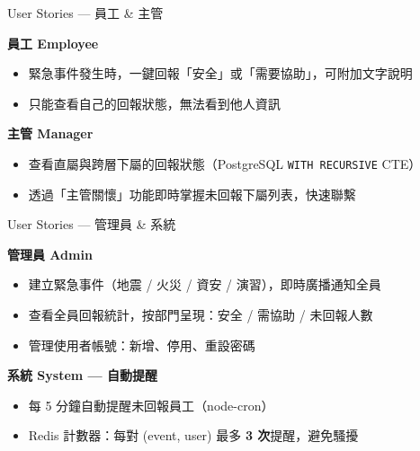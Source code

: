 \documentclass[aspectratio=169,12pt]{beamer}
\begin{document}
\begin{frame}{User Stories — 員工 \& 主管}
\begin{block}{\textbf{員工 \enspace Employee}}
  \begin{itemize}\small
    \item 緊急事件發生時，\alert{一鍵回報「安全」或「需要協助」}，可附加文字說明
    \item 只能查看\alert{自己的回報狀態}，無法看到他人資訊
  \end{itemize}
\end{block}
\vspace{0.35cm}
\begin{block}{\textbf{主管 \enspace Manager}}
  \begin{itemize}\small
    \item 查看\alert{直屬與跨層下屬}的回報狀態（PostgreSQL \texttt{WITH RECURSIVE} CTE）
    \item 透過「主管關懷」功能即時掌握\alert{未回報下屬}列表，快速聯繫
  \end{itemize}
\end{block}
\end{frame}

\begin{frame}{User Stories — 管理員 \& 系統}
\begin{block}{\textbf{管理員 \enspace Admin}}
  \begin{itemize}\small
    \item \alert{建立緊急事件}（地震 / 火災 / 資安 / 演習），即時廣播通知全員
    \item 查看\alert{全員回報統計}，按部門呈現：安全 / 需協助 / 未回報人數
    \item 管理\alert{使用者帳號}：新增、停用、重設密碼
  \end{itemize}
\end{block}
\vspace{0.35cm}
\begin{alertblock}{\textbf{系統 \enspace System — 自動提醒}}
  \begin{itemize}\small
    \item 每 5 分鐘自動提醒\alert{未回報員工}（node-cron）
    \item Redis 計數器：每對 (event, user) 最多 \textbf{3 次}提醒，避免騷擾
  \end{itemize}
\end{alertblock}
\end{frame}
\end{document}
